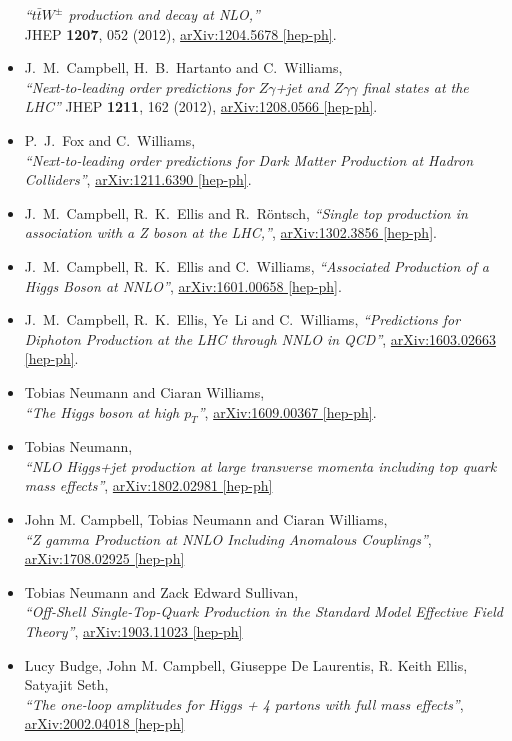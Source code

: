 \begin{itemize}
  {\it ``$t \bar{t} W^{\pm}$ production and decay at NLO,''} \\
  JHEP {\bf 1207}, 052 (2012),
  \href{https://arxiv.org/abs/1204.5678}{arXiv:1204.5678 [hep-ph]}.
%
\item J.~M.~Campbell, H.~B.~Hartanto and C.~Williams,\\
  {\it ``Next-to-leading order predictions for $Z \gamma$+jet and $Z \gamma \gamma$ final states at the LHC''}
   JHEP {\bf 1211}, 162 (2012), 
\href{https://arxiv.org/abs/1208.0566}{arXiv:1208.0566 [hep-ph]}.	
%
\item P.~J.~Fox  and C.~Williams,\\
      {\it ``Next-to-leading order predictions for Dark Matter Production at Hadron Colliders''},
\href{https://arxiv.org/abs/1211.6390}{arXiv:1211.6390 [hep-ph]}.	 
%
\item J.~M.~Campbell, R.~K.~Ellis and R.~R{\"o}ntsch,
  {\it ``Single top production in association with a Z boson at the LHC,''},
  \href{https://arxiv.org/abs/1302.3856}{arXiv:1302.3856 [hep-ph]}.
%
\item J.~M.~Campbell, R.~K.~Ellis and C.~Williams,
 {\it ``Associated Production of a Higgs Boson at NNLO''},
  \href{https://arxiv.org/abs/1601.00658}{arXiv:1601.00658 [hep-ph]}.
%
\item J.~M.~Campbell, R.~K.~Ellis, Ye~Li and C.~Williams,
  {\it ``Predictions for Diphoton Production at the LHC through NNLO in QCD''},
  \href{https://arxiv.org/abs/1603.02663}{arXiv:1603.02663 [hep-ph]}. 
%
\item Tobias Neumann and Ciaran Williams,\\
   {\it ``{The Higgs boson at high $p_T$}''},
   \href{https://arxiv.org/abs/1609.00367}{arXiv:1609.00367 [hep-ph]}.
%
\item Tobias Neumann,\\
  {\it ``NLO Higgs+jet production at large transverse momenta including top quark mass effects''},
  \href{https://arxiv.org/abs/1802.02981}{arXiv:1802.02981 [hep-ph]}
%
\item John M. Campbell, Tobias Neumann and Ciaran Williams,\\
{\it ``Z gamma Production at NNLO Including Anomalous Couplings''},
\href{https://arxiv.org/abs/1708.02925}{arXiv:1708.02925 [hep-ph]}
%
\item Tobias Neumann and Zack Edward Sullivan,\\
{\it ``Off-Shell Single-Top-Quark Production in the Standard Model Effective Field Theory''},
\href{https://arxiv.org/abs/1903.11023}{arXiv:1903.11023 [hep-ph]}
%
\item  Lucy Budge, John M. Campbell, Giuseppe De Laurentis, R. Keith Ellis, Satyajit Seth,\\
{\it ``The one-loop amplitudes for Higgs + 4 partons with full mass effects''},
\href{https://arxiv.org/abs/2002.04018}{arXiv:2002.04018 [hep-ph]}


\end{itemize}
